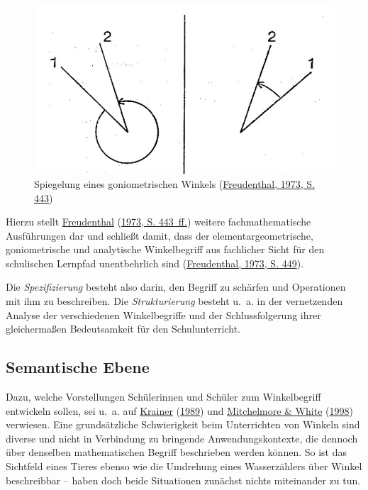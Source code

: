 \documentclass[
  ngerman,
]{scrbook}
\theoremstyle{definition}
\theoremstyle{definition}
\theoremstyle{definition}
\theoremstyle{definition}
\theoremstyle{remark}
\begin{document}
\begin{figure}

{\centering \includegraphics[width=0.5\linewidth]{pictures/2-FreudenthalWinkelSpiegeln} 

}

\caption{Spiegelung eines goniometrischen Winkels (\protect\hyperlink{ref-Freudenthal:1973}{Freudenthal, 1973, S. 443})}\label{fig:FreudenthalWinkelSpiegeln}
\end{figure}

Hierzu stellt \protect\hyperlink{ref-Freudenthal:1973}{Freudenthal} (\protect\hyperlink{ref-Freudenthal:1973}{1973, S. 443~ff.}) weitere fachmathematische Ausführungen dar und schließt damit, dass der elementargeometrische, goniometrische und analytische Winkelbegriff aus fachlicher Sicht für den schulischen Lernpfad unentbehrlich sind (\protect\hyperlink{ref-Freudenthal:1973}{Freudenthal, 1973, S. 449}).

Die \emph{Spezifizierung} besteht also darin, den Begriff zu schärfen und Operationen mit ihm zu beschreiben. Die \emph{Strukturierung} besteht u.~a. in der vernetzenden Analyse der verschiedenen Winkelbegriffe und der Schlussfolgerung ihrer gleichermaßen Bedeutsamkeit für den Schulunterricht.

\hypertarget{semantische-ebene}{%
\subsection{Semantische Ebene}\label{semantische-ebene}}

Dazu, welche Vorstellungen Schülerinnen und Schüler zum Winkelbegriff entwickeln sollen, sei u.~a. auf \protect\hyperlink{ref-Krainer:1989}{Krainer} (\protect\hyperlink{ref-Krainer:1989}{1989}) und \protect\hyperlink{ref-Mitchelmore:1998}{Mitchelmore \& White} (\protect\hyperlink{ref-Mitchelmore:1998}{1998}) verwiesen. Eine grundsätzliche Schwierigkeit beim Unterrichten von Winkeln sind diverse und nicht in Verbindung zu bringende Anwendungskontexte, die dennoch über denselben mathematischen Begriff beschrieben werden können. So ist das Sichtfeld eines Tieres ebenso wie die Umdrehung eines Wasserzählers über Winkel beschreibbar -- haben doch beide Situationen zunächst nichts miteinander zu tun.
\end{document}
